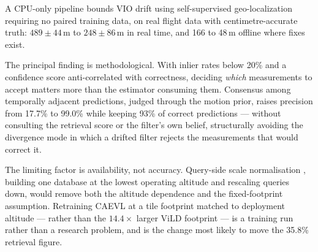 \documentclass[conference]{IEEEtran}
\begin{document}
A CPU-only pipeline bounds VIO drift using self-supervised geo-localization
requiring no paired training data, on real flight data with centimetre-accurate
truth: $489\pm44$\,m to $248\pm86$\,m in real time, and 166 to 48\,m offline
where fixes exist.

The principal finding is methodological. With inlier rates below 20\% and a
confidence score anti-correlated with correctness, deciding \emph{which}
measurements to accept matters more than the estimator consuming them. Consensus
among temporally adjacent predictions, judged through the motion prior, raises
precision from 17.7\% to 99.0\% while keeping 93\% of correct predictions ---
without consulting the retrieval score or the filter's own belief, structurally
avoiding the divergence mode in which a drifted filter rejects the measurements
that would correct it.

The limiting factor is availability, not accuracy. Query-side scale
normalisation \cite{shao2026altitude}, building one database at the lowest
operating altitude and rescaling queries down, would remove both the altitude
dependence and the fixed-footprint assumption. Retraining CAEVL at a tile
footprint matched to deployment altitude --- rather than the $14.4\times$ larger
ViLD footprint --- is a training run rather than a research problem, and is the
change most likely to move the 35.8\% retrieval figure.

\clearpage

\printbibliography
\end{document}
